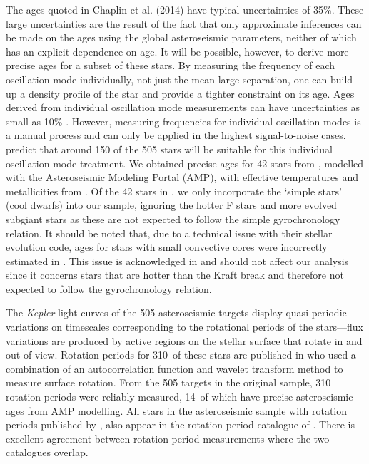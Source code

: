 \documentclass[11pt,preprint]{aastex}
\newcommand{\nastero}{310}
\newcommand{\nprecise}{14~}
\newcommand{\ngarcia}{310~}
\begin{document}
The ages quoted in Chaplin et al. (2014) have typical uncertainties of 35\%.
These large uncertainties are the result of the fact that only approximate
inferences can be made on the ages using the global asteroseismic parameters,
neither of which has an explicit dependence on age.
It will be possible, however, to derive more precise ages for a subset of
these stars.
By measuring the frequency of each oscillation mode individually, not just the
mean large separation, one can build up a density profile of the star and
provide a tighter constraint on its age.
Ages derived from individual oscillation mode measurements can have
uncertainties as small as 10\% \citep{Brown1994, SilvaAguirre2013}.
However, measuring frequencies for individual oscillation modes is a manual
process and can only be applied in the highest signal-to-noise cases.
\citet{Chaplin2014} predict that around 150 of the 505 stars will be suitable
for this individual oscillation mode treatment.
We obtained precise ages for 42 stars from \citet{Metcalfe2014}, modelled with
the Asteroseismic Modeling Portal (AMP), with effective temperatures and
metallicities from \citet{Bruntt2012}.
Of the 42 stars in \citet{Metcalfe2014}, we only incorporate the `simple
stars' (cool dwarfs) into our sample, ignoring the hotter F stars and more
evolved subgiant stars as these are not expected to follow the simple
gyrochronology relation.
It should be noted that, due to a technical issue with their stellar evolution
code, ages for stars with small convective cores were incorrectly estimated in
\citet{Chaplin2014}.
This issue is acknowledged in \citet{Metcalfe2014} and should not affect our
analysis since it concerns stars that are hotter than the Kraft break and
therefore not expected to follow the gyrochronology relation.

The {\it Kepler} light curves of the 505 asteroseismic targets display
quasi-periodic variations on timescales corresponding to the rotational
periods of the stars---flux variations are produced by active regions on the
stellar surface that rotate in and out of view.
Rotation periods for \ngarcia of these stars are published in
\citet{Garcia2014} who used a combination of an autocorrelation function and
wavelet transform method to measure surface rotation.
From the 505 targets in the original sample, \nastero$~$rotation periods were
reliably measured, \nprecise of which have precise asteroseismic ages from AMP
modelling.
All stars in the asteroseismic sample with rotation periods published by
\citet{McQuillan_2014}, also appear in the rotation period catalogue of
\citet{Garcia2014}.
There is excellent agreement between rotation period
measurements where the two catalogues overlap.
\end{document}
